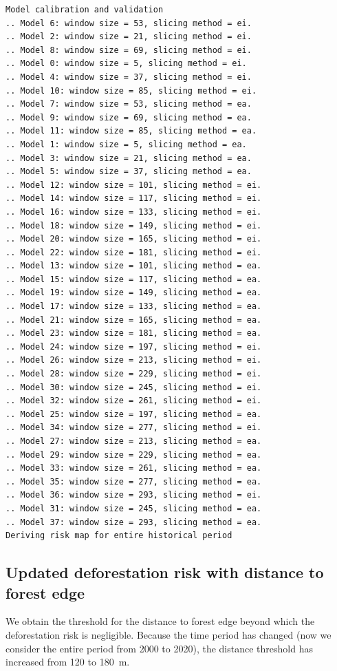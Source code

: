 \documentclass[paper=a4, 12pt, DIV=12]{scrartcl}
\begin{document}
\begin{verbatim}
Model calibration and validation
.. Model 6: window size = 53, slicing method = ei.
.. Model 2: window size = 21, slicing method = ei.
.. Model 8: window size = 69, slicing method = ei.
.. Model 0: window size = 5, slicing method = ei.
.. Model 4: window size = 37, slicing method = ei.
.. Model 10: window size = 85, slicing method = ei.
.. Model 7: window size = 53, slicing method = ea.
.. Model 9: window size = 69, slicing method = ea.
.. Model 11: window size = 85, slicing method = ea.
.. Model 1: window size = 5, slicing method = ea.
.. Model 3: window size = 21, slicing method = ea.
.. Model 5: window size = 37, slicing method = ea.
.. Model 12: window size = 101, slicing method = ei.
.. Model 14: window size = 117, slicing method = ei.
.. Model 16: window size = 133, slicing method = ei.
.. Model 18: window size = 149, slicing method = ei.
.. Model 20: window size = 165, slicing method = ei.
.. Model 22: window size = 181, slicing method = ei.
.. Model 13: window size = 101, slicing method = ea.
.. Model 15: window size = 117, slicing method = ea.
.. Model 19: window size = 149, slicing method = ea.
.. Model 17: window size = 133, slicing method = ea.
.. Model 21: window size = 165, slicing method = ea.
.. Model 23: window size = 181, slicing method = ea.
.. Model 24: window size = 197, slicing method = ei.
.. Model 26: window size = 213, slicing method = ei.
.. Model 28: window size = 229, slicing method = ei.
.. Model 30: window size = 245, slicing method = ei.
.. Model 32: window size = 261, slicing method = ei.
.. Model 25: window size = 197, slicing method = ea.
.. Model 34: window size = 277, slicing method = ei.
.. Model 27: window size = 213, slicing method = ea.
.. Model 29: window size = 229, slicing method = ea.
.. Model 33: window size = 261, slicing method = ea.
.. Model 35: window size = 277, slicing method = ea.
.. Model 36: window size = 293, slicing method = ei.
.. Model 31: window size = 245, slicing method = ea.
.. Model 37: window size = 293, slicing method = ea.
Deriving risk map for entire historical period
\end{verbatim}

\subsection{Updated deforestation risk with distance to forest edge}
\label{sec:org8a8717f}

We obtain the threshold for the distance to forest edge beyond which the deforestation risk is negligible. Because the time period has changed (now we consider the entire period from 2000 to 2020), the distance threshold has increased from 120 to 180 m.
\end{document}

